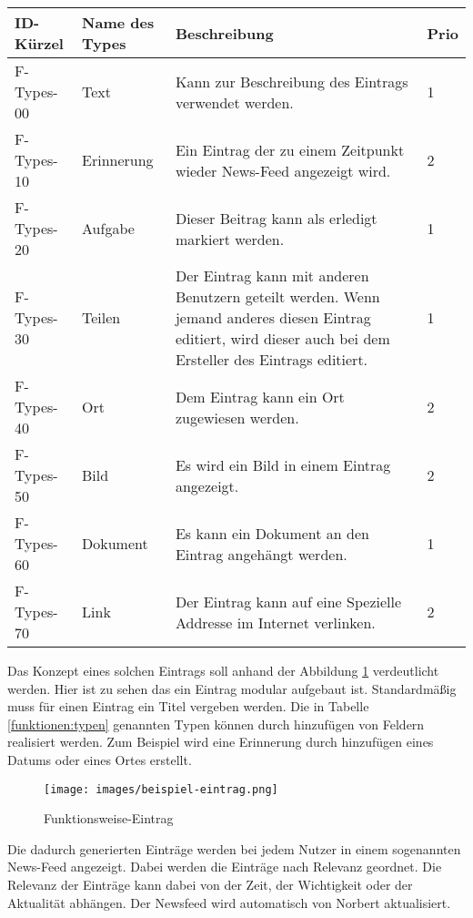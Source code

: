\begin{tabularx}{\textwidth}{|l|l|X|l|}
    \toprule
    \textbf{ID-Kürzel} & \textbf{Name des Types} & \textbf{Beschreibung} & \textbf{Prio}\\
    \midrule
    \endhead
    \hline
    \caption{Typen von Einträgen}
    \label{funktionen:typen}
    \endfoot
    F-Types-00 & Text & Kann zur Beschreibung des Eintrags verwendet werden. & 1\\
    F-Types-10 & Erinnerung & Ein Eintrag der zu einem Zeitpunkt wieder News-Feed angezeigt wird. & 2 \\
    F-Types-20 & Aufgabe & Dieser Beitrag kann als erledigt markiert werden. & 1\\
    F-Types-30 & Teilen & Der Eintrag kann mit anderen Benutzern geteilt werden.
    Wenn jemand anderes diesen Eintrag editiert, wird dieser auch bei dem Ersteller des Eintrags editiert. & 1\\
    F-Types-40 & Ort & Dem Eintrag kann ein Ort zugewiesen werden. & 2 \\
    F-Types-50 & Bild & Es wird ein Bild in einem Eintrag angezeigt. & 2 \\
    F-Types-60 & Dokument & Es kann ein Dokument an den Eintrag angehängt werden. & 1\\
    F-Types-70 & Link & Der Eintrag kann auf eine Spezielle Addresse im Internet verlinken. & 2\\
\end{tabularx}

Das Konzept eines solchen Eintrags soll anhand der Abbildung \ref{funktionen:Eintrag} verdeutlicht werden. 
Hier ist zu sehen das ein Eintrag modular aufgebaut ist. Standardmäßig muss für einen Eintrag ein Titel vergeben werden.
Die in Tabelle \ref{funktionen:typen} genannten Typen können durch hinzufügen von Feldern realisiert werden. Zum Beispiel wird eine Erinnerung durch hinzufügen eines Datums oder eines Ortes erstellt.

\begin{figure}[H]
    \centering
    \texttt{[image: images/beispiel-eintrag.png]}
    \caption{Funktionsweise-Eintrag}
    \label{funktionen:Eintrag}

\end{figure}

Die dadurch generierten Einträge werden bei jedem Nutzer in einem sogenannten News-Feed angezeigt.
Dabei werden die Einträge nach Relevanz geordnet.
Die Relevanz der Einträge kann dabei von der Zeit, der Wichtigkeit oder der Aktualität abhängen.
Der Newsfeed wird automatisch von Norbert aktualisiert.

